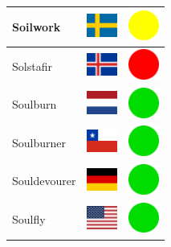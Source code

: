 \documentclass[12pt, a4paper, twoside]{report}
\begin{document}
\begin{center}
\begin{longtable}{|p{5cm}|p{2cm}|p{2cm}|}
 Soilwork                                                   & \includegraphics[width=1cm]{../4x3/se} &   \includegraphics[width=1cm]{../likes/m} \\ \hline
 Solstafir                                                  & \includegraphics[width=1cm]{../4x3/is} &   \includegraphics[width=1cm]{../likes/n} \\ \hline
 Soulburn                                                   & \includegraphics[width=1cm]{../4x3/nl} &   \includegraphics[width=1cm]{../likes/y} \\ \hline
 Soulburner                                                 & \includegraphics[width=1cm]{../4x3/cl} &   \includegraphics[width=1cm]{../likes/y} \\ \hline
 Souldevourer                                               & \includegraphics[width=1cm]{../4x3/de} &   \includegraphics[width=1cm]{../likes/y} \\ \hline
 Soulfly                                                    & \includegraphics[width=1cm]{../4x3/us} &   \includegraphics[width=1cm]{../likes/y} \\ \hline

\end{longtable}
\end{center}
\end{document}
